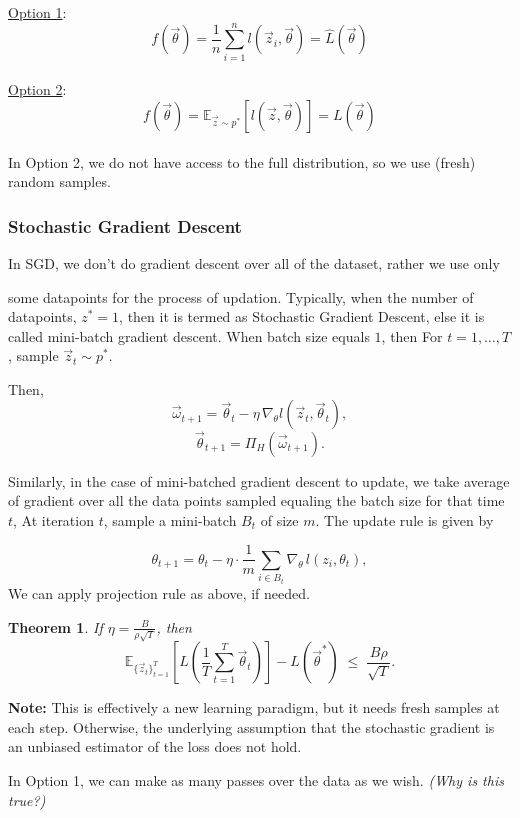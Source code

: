 \documentclass[11pt]{article}
\theoremstyle{plain}
\newtheorem{theorem}{Theorem}
\begin{document}
\underline{Option 1}:
\[
f(\vec{\theta}) = \frac{1}{n} \sum_{i=1}^{n} l(\vec{z}_i, \vec{\theta}) = \hat{L}(\vec{\theta})
\]
\\
\underline{Option 2}:
\[
f(\vec{\theta}) = \mathbb{E}_{\vec{z} \sim p^*} \left[ l(\vec{z}, \vec{\theta}) \right] = L(\vec{\theta})
\]\\

In Option 2, we do not have access to the full distribution, so we use (fresh) random samples.

\subsubsection{Stochastic Gradient Descent}
In SGD, we don't do gradient descent over all of the dataset, rather we use only

some datapoints for the process of updation. Typically, when the number of datapoints, $z^* =1$, then it is termed as Stochastic Gradient Descent, else it is called mini-batch gradient descent. When batch size equals $1$, then  For $t = 1, \dots, T$, sample $\vec{z}_t \sim p^*$.  

Then,
\[
\vec{\omega}_{t+1} = \vec{\theta}_t - \eta \, \nabla_\theta l(\vec{z}_t, \vec{\theta}_t),
\]
\[
\vec{\theta}_{t+1} = \Pi_H(\vec{\omega}_{t+1}).
\]

Similarly, in the case of mini-batched gradient descent to update, we take average of gradient over all the data points sampled equaling the batch size for that time $t$,
At iteration $t$, sample a mini-batch $B_t$ of size $m$.  
The update rule is given by

\[
\theta_{t+1} 
= \theta_t - \eta \cdot \frac{1}{m} \sum_{i \in B_t} \nabla_\theta \, l(z_i, \theta_t),
\]
We can apply projection rule as above, if needed.
\begin{theorem}
If $\eta = \frac{B}{\rho \sqrt{T}}$, then
\[
\mathbb{E}_{\{\vec{z}_t\}_{t=1}^T} \left[ L\!\left( \frac{1}{T} \sum_{t=1}^T \vec{\theta}_t \right) \right]
- L(\vec{\theta}^*)
\;\le\; \frac{B\rho}{\sqrt{T}}.
\]
\end{theorem}

\noindent\textbf{Note:} This is effectively a new learning paradigm, but it needs fresh samples at each step.  
Otherwise, the underlying assumption that the stochastic gradient is an unbiased estimator of the loss does not hold.

\medskip
\noindent 
In Option 1, we can make as many passes over the data as we wish. \textit{(Why is this true?)} 
\end{document}
